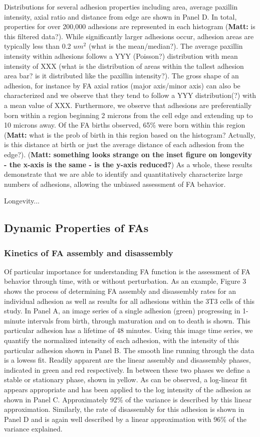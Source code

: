 \documentclass[10pt]{article}
\begin{document}
Distributions for several adhesion properties including area, average paxillin
intensity, axial ratio and distance from edge are shown in Panel D. In total,
properties for over 200,000 adhesions are represented in each histogram
(\textbf{Matt:} is this filtered data?). While significantly larger adhesions
occur, adhesion areas are typically less than 0.2 $um^2$ (what is the
mean/median?). The average paxillin intensity within adhesions follows a YYY
(Poisson?) distribution with mean intensity of XXX (what is the distribution of
areas within the tallest adhesion area bar? is it distributed like the paxillin
intensity?). The gross shape of an adhesion, for instance by FA axial ratios
(major axis/minor axis) can also be characterized and we observe that they tend
to follow a YYY distribution(?) with a mean value of XXX. Furthermore, we
observe that adhesions are preferentially born within a region beginning 2
microns from the cell edge and extending up to 10 microns away. Of the FA births
observed, 65\% were born within this region (\textbf{Matt:} what is the prob of
birth in this region based on the histogram? Actually, is this distance at birth
or just the average distance of each adhesion from the edge?). (\textbf{Matt:
something looks strange on the inset figure on longevity - the x-axis is the
same - is the y-axis reduced?}) As a whole, these results demonstrate that we
are able to identify and quantitatively characterize large numbers of adhesions,
allowing the unbiased assessment of FA behavior.

Longevity...

\subsection*{Dynamic Properties of FAs}
\subsubsection*{Kinetics of FA assembly and disassembly}
Of particular importance for understanding FA function is the assessment of FA
behavior through time, with or without perturbation. As an example, Figure 3
shows the process of determining FA assembly and disassembly rates for an
individual adhesion as well as results for all adhesions within the 3T3 cells of
this study. In Panel A, an image series of a single adhesion (green) progressing
in 1-minute intervals from birth, through maturation and on to death is shown.
This particular adhesion has a lifetime of 48 minutes. Using this image time
series, we quantify the normalized intensity of each adhesion, with the
intensity of this particular adhesion shown in Panel B. The smooth line running
through the data is a lowess fit. Readily apparent are the linear assembly and
disassembly phases, indicated in green and red respectively. In between these
two phases we define a stable or stationary phase, shown in yellow. As can be
observed, a log-linear fit appears appropriate and has been applied to the log
intensity of the adhesion as shown in Panel C. Approximately 92\% of the
variance is described by this linear approximation. Similarly, the rate of
disassembly for this adhesion is shown in Panel D and is again well described by
a linear approximation with 96\% of the variance explained.
\end{document}

